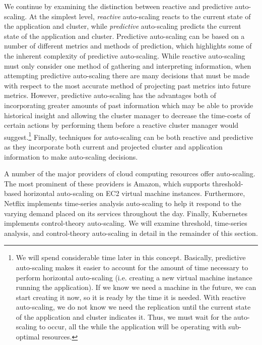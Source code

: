 \documentclass[twoside]{report}
\begin{document}
We continue by examining the distinction between reactive and predictive
auto-scaling. At the simplest level, \textit{reactive} auto-scaling reacts to
the current state of the application and cluster, while \textit{predictive}
auto-scaling predicts the current state of the application and cluster.\cite[pg.
12]{auto-scaling-techniques-for-elastic-applications-in-cloud-environments}
Predictive auto-scaling can be based on a number of different metrics and
methods of prediction, which highlights some of the inherent complexity of
predictive auto-scaling. While reactive auto-scaling must only consider one
method of gathering and interpreting information, when attempting predictive
auto-scaling there are many decisions that must be made with respect to the
most accurate method of projecting past metrics into future metrics. However,
predictive auto-scaling has the advantages both of incorporating greater amounts
of past information which may be able to provide historical insight and allowing
the cluster manager to decrease the time-costs of certain actions by performing
them before a reactive cluster manager would suggest.\footnote{We will spend
considerable time later in this concept. Basically, predictive auto-scaling
makes it easier to account for the amount of time necessary to perform
horizontal auto-scaling (i.e. creating a new virtual machine instance running
the application). If we know we need a machine in the future, we can start
creating it now, so it is ready by the time it is needed. With reactive
auto-scaling, we do not know we need the replication until the current state of
the application and cluster indicates it. Thus, we must wait for the
auto-scaling to occur, all the while the application will be operating with
sub-optimal resources.}
Finally, techniques for auto-scaling can be both reactive and predictive as
they incorporate both current and projected cluster and application information
to make auto-scaling decisions.

A number of the major providers of cloud computing resources offer auto-scaling.
The most prominent of these providers is Amazon, which supports threshold-based
horizontal auto-scaling on EC2 virtual machine
instances.\cite{amazon-auto-scaling-developer-guide} Furthermore, Netflix
implements time-series analysis auto-scaling to help it respond to the
varying demand placed on its services throughout the
day.\cite{netflix-scryer-part-i} Finally, Kubernetes
implements control-theory auto-scaling.\cite{k8s-horizontal-pod-autoscaler-proposal}
We will examine threshold, time-series analysis, and control-theory
auto-scaling in detail in the remainder of this section.
\end{document}
